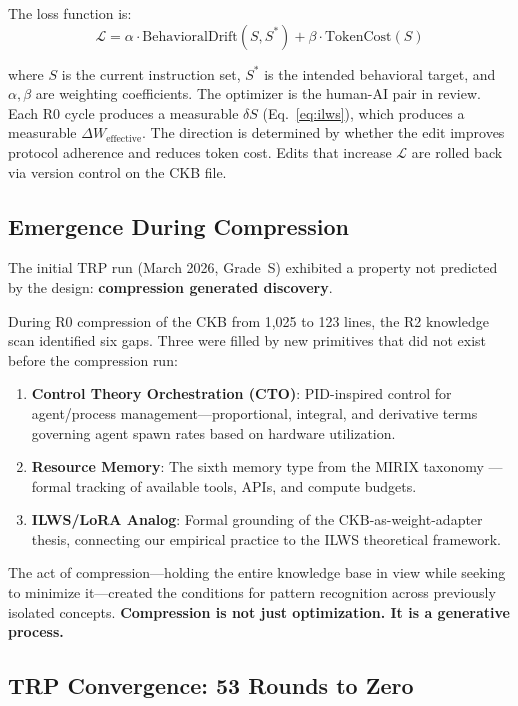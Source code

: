 \documentclass[11pt, a4paper]{article}
\begin{document}
The loss function is:
\begin{equation}
    \mathcal{L} = \alpha \cdot \text{BehavioralDrift}(S, S^*) + \beta \cdot \text{TokenCost}(S)
    \label{eq:loss}
\end{equation}

\noindent where $S$ is the current instruction set, $S^*$ is the intended behavioral target, and $\alpha, \beta$ are weighting coefficients. The optimizer is the human-AI pair in review. Each R0 cycle produces a measurable $\delta S$ (Eq.~\ref{eq:ilws}), which produces a measurable $\Delta W_{\text{effective}}$. The direction is determined by whether the edit improves protocol adherence and reduces token cost. Edits that increase $\mathcal{L}$ are rolled back via version control on the CKB file.

\subsection{Emergence During Compression}

The initial TRP run (March 2026, Grade~S) exhibited a property not predicted by the design: \textbf{compression generated discovery}.

During R0 compression of the CKB from 1,025 to 123 lines, the R2 knowledge scan identified six gaps. Three were filled by new primitives that did not exist before the compression run:

\begin{enumerate}[leftmargin=*]
    \item \textbf{Control Theory Orchestration (CTO)}: PID-inspired control for agent/process management---proportional, integral, and derivative terms governing agent spawn rates based on hardware utilization.
    \item \textbf{Resource Memory}: The sixth memory type from the MIRIX taxonomy \citep{mirix2026}---formal tracking of available tools, APIs, and compute budgets.
    \item \textbf{ILWS/LoRA Analog}: Formal grounding of the CKB-as-weight-adapter thesis, connecting our empirical practice to the ILWS theoretical framework.
\end{enumerate}

The act of compression---holding the entire knowledge base in view while seeking to minimize it---created the conditions for pattern recognition across previously isolated concepts. \textbf{Compression is not just optimization. It is a generative process.}

\subsection{TRP Convergence: 53 Rounds to Zero}
\end{document}
